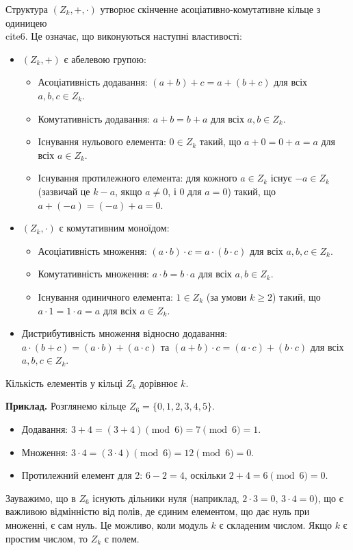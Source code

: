 \documentclass[a4paper,12pt]{article}
\begin{document}
    Структура \((Z_k, +, \cdot)\) утворює скінченне асоціативно-комутативне кільце з одиницею \\cite{6}. Це означає, що виконуються наступні властивості:
    \begin{itemize}
        \item \((Z_k, +)\) є абелевою групою:
        \begin{itemize}
            \item Асоціативність додавання: \((a+b)+c = a+(b+c)\) для всіх \(a,b,c \in Z_k\).
            \item Комутативність додавання: \(a+b = b+a\) для всіх \(a,b \in Z_k\).
            \item Існування нульового елемента: \(0 \in Z_k\) такий, що \(a+0 = 0+a = a\) для всіх \(a \in Z_k\).
            \item Існування протилежного елемента: для кожного \(a \in Z_k\) існує \(-a \in Z_k\) (зазвичай це \(k-a\), якщо \(a \ne 0\), і \(0\) для \(a=0\)) такий, що \(a+(-a) = (-a)+a = 0\).
        \end{itemize}
        \item \((Z_k, \cdot)\) є комутативним моноїдом:
        \begin{itemize}
            \item Асоціативність множення: \((a \cdot b) \cdot c = a \cdot (b \cdot c)\) для всіх \(a,b,c \in Z_k\).
            \item Комутативність множення: \(a \cdot b = b \cdot a\) для всіх \(a,b \in Z_k\).
            \item Існування одиничного елемента: \(1 \in Z_k\) (за умови \(k \ge 2\)) такий, що \(a \cdot 1 = 1 \cdot a = a\) для всіх \(a \in Z_k\).
        \end{itemize}
        \item Дистрибутивність множення відносно додавання: \(a \cdot (b+c) = (a \cdot b) + (a \cdot c)\) та \((a+b) \cdot c = (a \cdot c) + (b \cdot c)\) для всіх \(a,b,c \in Z_k\).
    \end{itemize}
    Кількість елементів у кільці \(Z_k\) дорівнює \(k\).

    \textbf{Приклад.} Розглянемо кільце \(Z_6 = \{0, 1, 2, 3, 4, 5\}\).
    \begin{itemize}
        \item Додавання: \(3 + 4 = (3+4) \pmod{6} = 7 \pmod{6} = 1\).
        \item Множення: \(3 \cdot 4 = (3 \cdot 4) \pmod{6} = 12 \pmod{6} = 0\).
        \item Протилежний елемент для 2: \(6-2=4\), оскільки \(2+4 = 6 \pmod{6} = 0\).
    \end{itemize}
    Зауважимо, що в \(Z_6\) існують дільники нуля (наприклад, \(2 \cdot 3 = 0\), \(3 \cdot 4 = 0\)), що є важливою відмінністю від полів, де єдиним елементом, що дає нуль при множенні, є сам нуль. Це можливо, коли модуль \(k\) є складеним числом. Якщо \(k\) є простим числом, то \(Z_k\) є полем.
\end{document}
